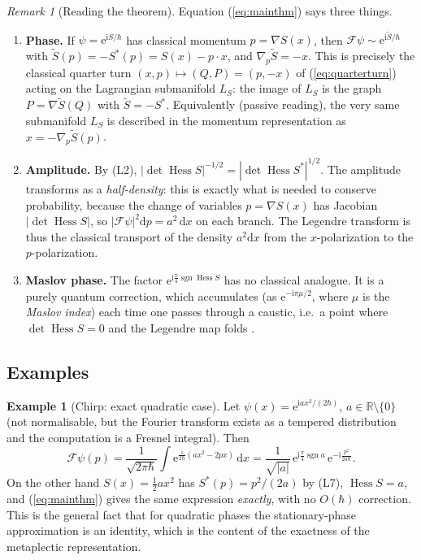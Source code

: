 \documentclass[11pt,a4paper]{article}
\newcommand{\R}{\mathbb{R}}
\newcommand{\ii}{\mathrm{i}}
\newcommand{\dd}{\mathrm{d}}
\newcommand{\ee}{\mathrm{e}}
\newcommand{\hb}{\hbar}
\newcommand{\sgn}{\operatorname{sgn}}
\newcommand{\Hess}{\operatorname{Hess}}
\newcommand{\FT}{\mathcal{F}}
\theoremstyle{plain}
\theoremstyle{definition}
\newtheorem{example}[theorem]{Example}
\theoremstyle{remark}
\newtheorem{remark}[theorem]{Remark}
\begin{document}
\begin{remark}[Reading the theorem]\label{rem:reading}
Equation (\ref{eq:mainthm}) says three things.
\begin{enumerate}[label=(\roman*),leftmargin=*]
\item \textbf{Phase.} If $\psi=\ee^{\ii S/\hb}$ has classical momentum $p=\nabla S(x)$, then $\FT\psi\sim\ee^{\ii\tilde S/\hb}$ with $\tilde S(p)=-S^*(p)=S(x)-p\cdot x$, and $\nabla_p\tilde S=-x$. This is precisely the classical quarter turn $(x,p)\mapsto(Q,P)=(p,-x)$ of (\ref{eq:quarterturn}) acting on the Lagrangian submanifold $L_S$: the image of $L_S$ is the graph $P=\nabla\tilde S(Q)$ with $\tilde S=-S^*$. Equivalently (passive reading), the very same submanifold $L_S$ is described in the momentum representation as $x=-\nabla_p\tilde S(p)$.
\item \textbf{Amplitude.} By (L2), $|\det\Hess S|^{-1/2}=|\det\Hess S^*|^{1/2}$. The amplitude transforms as a \emph{half-density}: this is exactly what is needed to conserve probability, because the change of variables $p=\nabla S(x)$ has Jacobian $|\det\Hess S|$, so $|\FT\psi|^2\dd p=a^2\,\dd x$ on each branch. The Legendre transform is thus the classical transport of the density $a^2\dd x$ from the $x$-polarization to the $p$-polarization.
\item \textbf{Maslov phase.} The factor $\ee^{\ii\frac\pi4\sgn\Hess S}$ has no classical analogue. It is a purely quantum correction, which accumulates (as $\ee^{-\ii\pi\mu/2}$, where $\mu$ is the \emph{Maslov index}) each time one passes through a caustic, i.e.\ a point where $\det\Hess S=0$ and the Legendre map folds \cite{Maslov,MaslovFedoriuk,Keller,Duistermaat}.
\end{enumerate}
\end{remark}

\subsection{Examples}

\begin{example}[Chirp: exact quadratic case]\label{ex:chirp}
Let $\psi(x)=\ee^{\ii a x^2/(2\hb)}$, $a\in\R\setminus\{0\}$ (not normalisable, but the Fourier transform exists as a tempered distribution and the computation is a Fresnel integral). Then
\begin{equation}
\FT\psi(p)=\frac{1}{\sqrt{2\pi\hb}}\int\ee^{\frac{\ii}{2\hb}(ax^2-2px)}\,\dd x=\frac{1}{\sqrt{|a|}}\,\ee^{\ii\frac\pi4\sgn a}\,\ee^{-\ii\frac{p^2}{2a\hb}} .
\end{equation}
On the other hand $S(x)=\tfrac12ax^2$ has $S^*(p)=p^2/(2a)$ by (L7), $\Hess S=a$, and (\ref{eq:mainthm}) gives the same expression \emph{exactly}, with no $O(\hb)$ correction. This is the general fact that for quadratic phases the stationary-phase approximation is an identity, which is the content of the exactness of the metaplectic representation.
\end{example}
\end{document}
